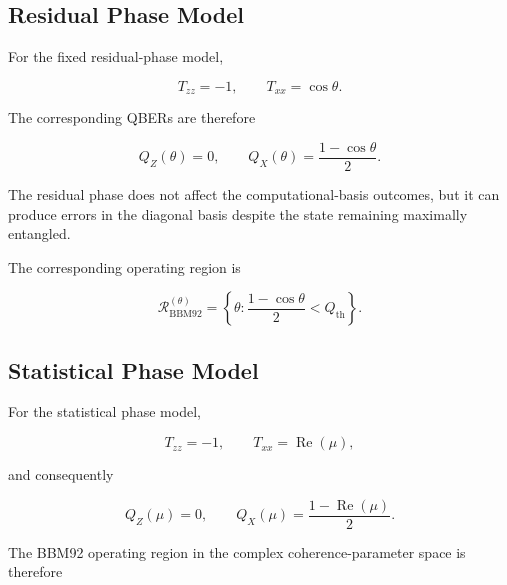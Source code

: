 \subsection{Residual Phase Model}
\label{subsec:bbm92_region_residual_phase}

For the fixed residual-phase model,

\begin{equation}
T_{zz}
=
-1,
\qquad
T_{xx}
=
\cos\theta.
\end{equation}

The corresponding QBERs are therefore

\begin{equation}
Q_Z(\theta)
=
0,
\qquad
Q_X(\theta)
=
\frac{1-\cos\theta}{2}.
\label{eq:bbm92_qber_residual_phase}
\end{equation}

The residual phase does not affect the computational-basis outcomes, but it can
produce errors in the diagonal basis despite the state remaining maximally
entangled.

The corresponding operating region is

\begin{equation}
\boxed{
\mathcal{R}_{\mathrm{BBM92}}^{(\theta)}
=
\left\{
\theta:
\frac{1-\cos\theta}{2}
<
Q_{\mathrm{th}}
\right\}.
}
\label{eq:bbm92_region_residual_phase}
\end{equation}


\subsection{Statistical Phase Model}
\label{subsec:bbm92_region_statistical_phase}

For the statistical phase model,

\begin{equation}
T_{zz}
=
-1,
\qquad
T_{xx}
=
\operatorname{Re}(\mu),
\end{equation}

and consequently

\begin{equation}
Q_Z(\mu)
=
0,
\qquad
Q_X(\mu)
=
\frac{
1-\operatorname{Re}(\mu)
}{2}.
\label{eq:bbm92_qber_statistical_phase}
\end{equation}

The BBM92 operating region in the complex coherence-parameter space is therefore

